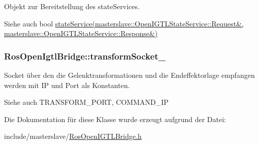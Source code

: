 Objekt zur Bereitstellung des state\-Services. 

\begin{DoxySeeAlso}{Siehe auch}
bool \hyperlink{classRosOpenIgtlBridge_ac8d2f37fe82fb7d0496d937920f48db6}{state\-Service(masterslave\-::\-Open\-I\-G\-T\-L\-State\-Service\-::\-Request\&, masterslave\-::\-Open\-I\-G\-T\-L\-State\-Service\-::\-Response\&)} 
\end{DoxySeeAlso}
\hypertarget{classRosOpenIgtlBridge_ac1cd3818cb07542c4534f7dfdb3b0258}{
\subsubsection[{transform\-Socket\-\_\-}]{\setlength{\rightskip}{0pt plus 5cm}Ros\-Open\-Igtl\-Bridge\-::transform\-Socket\-\_\-\hspace{0.3cm}{\ttfamily [private]}}}\label{classRosOpenIgtlBridge_ac1cd3818cb07542c4534f7dfdb3b0258}


Socket über den die Gelenktransformationen und die Endeffektorlage empfangen werden mit I\-P und Port als Konstanten. 

\begin{DoxySeeAlso}{Siehe auch}
T\-R\-A\-N\-S\-F\-O\-R\-M\-\_\-\-P\-O\-R\-T, C\-O\-M\-M\-A\-N\-D\-\_\-\-I\-P 
\end{DoxySeeAlso}


Die Dokumentation für diese Klasse wurde erzeugt aufgrund der Datei\-:\begin{DoxyCompactItemize}
\item 
include/masterslave/\hyperlink{RosOpenIGTLBridge_8h}{Ros\-Open\-I\-G\-T\-L\-Bridge.\-h}\end{DoxyCompactItemize}
